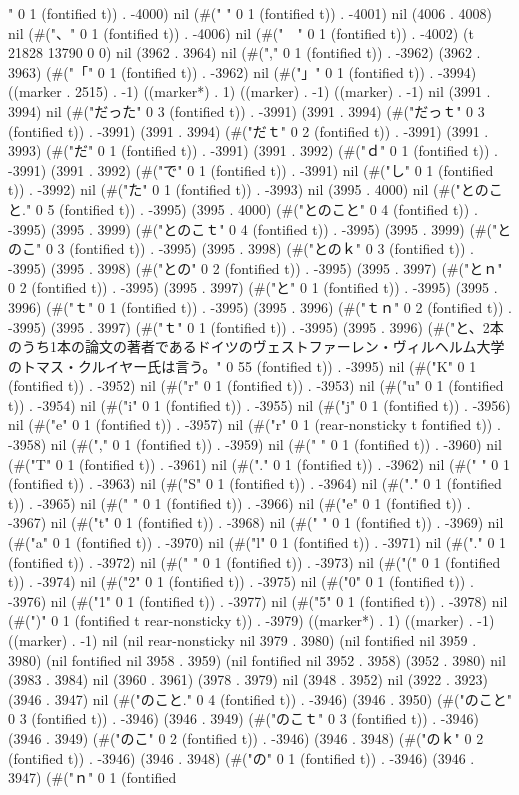 " 0 1 (fontified t)) . -4000) nil (#("
" 0 1 (fontified t)) . -4001) nil (4006 . 4008) nil (#("、" 0 1 (fontified t)) . -4006) nil (#("　" 0 1 (fontified t)) . -4002) (t 21828 13790 0 0) nil (3962 . 3964) nil (#("," 0 1 (fontified t)) . -3962) (3962 . 3963) (#("「" 0 1 (fontified t)) . -3962) nil (#("」" 0 1 (fontified t)) . -3994) ((marker . 2515) . -1) ((marker*) . 1) ((marker) . -1) ((marker) . -1) nil (3991 . 3994) nil (#("だった" 0 3 (fontified t)) . -3991) (3991 . 3994) (#("だっｔ" 0 3 (fontified t)) . -3991) (3991 . 3994) (#("だｔ" 0 2 (fontified t)) . -3991) (3991 . 3993) (#("だ" 0 1 (fontified t)) . -3991) (3991 . 3992) (#("ｄ" 0 1 (fontified t)) . -3991) (3991 . 3992) (#("で" 0 1 (fontified t)) . -3991) nil (#("し" 0 1 (fontified t)) . -3992) nil (#("た" 0 1 (fontified t)) . -3993) nil (3995 . 4000) nil (#("とのこと." 0 5 (fontified t)) . -3995) (3995 . 4000) (#("とのこと" 0 4 (fontified t)) . -3995) (3995 . 3999) (#("とのこｔ" 0 4 (fontified t)) . -3995) (3995 . 3999) (#("とのこ" 0 3 (fontified t)) . -3995) (3995 . 3998) (#("とのｋ" 0 3 (fontified t)) . -3995) (3995 . 3998) (#("との" 0 2 (fontified t)) . -3995) (3995 . 3997) (#("とｎ" 0 2 (fontified t)) . -3995) (3995 . 3997) (#("と" 0 1 (fontified t)) . -3995) (3995 . 3996) (#("ｔ" 0 1 (fontified t)) . -3995) (3995 . 3996) (#("ｔｎ" 0 2 (fontified t)) . -3995) (3995 . 3997) (#("ｔ" 0 1 (fontified t)) . -3995) (3995 . 3996) (#("と、2本のうち1本の論文の著者であるドイツのヴェストファーレン・ヴィルヘルム大学のトマス・クルイヤー氏は言う。" 0 55 (fontified t)) . -3995) nil (#("K" 0 1 (fontified t)) . -3952) nil (#("r" 0 1 (fontified t)) . -3953) nil (#("u" 0 1 (fontified t)) . -3954) nil (#("i" 0 1 (fontified t)) . -3955) nil (#("j" 0 1 (fontified t)) . -3956) nil (#("e" 0 1 (fontified t)) . -3957) nil (#("r" 0 1 (rear-nonsticky t fontified t)) . -3958) nil (#("," 0 1 (fontified t)) . -3959) nil (#(" " 0 1 (fontified t)) . -3960) nil (#("T" 0 1 (fontified t)) . -3961) nil (#("." 0 1 (fontified t)) . -3962) nil (#(" " 0 1 (fontified t)) . -3963) nil (#("S" 0 1 (fontified t)) . -3964) nil (#("." 0 1 (fontified t)) . -3965) nil (#(" " 0 1 (fontified t)) . -3966) nil (#("e" 0 1 (fontified t)) . -3967) nil (#("t" 0 1 (fontified t)) . -3968) nil (#(" " 0 1 (fontified t)) . -3969) nil (#("a" 0 1 (fontified t)) . -3970) nil (#("l" 0 1 (fontified t)) . -3971) nil (#("." 0 1 (fontified t)) . -3972) nil (#(" " 0 1 (fontified t)) . -3973) nil (#("(" 0 1 (fontified t)) . -3974) nil (#("2" 0 1 (fontified t)) . -3975) nil (#("0" 0 1 (fontified t)) . -3976) nil (#("1" 0 1 (fontified t)) . -3977) nil (#("5" 0 1 (fontified t)) . -3978) nil (#(")" 0 1 (fontified t rear-nonsticky t)) . -3979) ((marker*) . 1) ((marker) . -1) ((marker) . -1) nil (nil rear-nonsticky nil 3979 . 3980) (nil fontified nil 3959 . 3980) (nil fontified nil 3958 . 3959) (nil fontified nil 3952 . 3958) (3952 . 3980) nil (3983 . 3984) nil (3960 . 3961) (3978 . 3979) nil (3948 . 3952) nil (3922 . 3923) (3946 . 3947) nil (#("のこと." 0 4 (fontified t)) . -3946) (3946 . 3950) (#("のこと" 0 3 (fontified t)) . -3946) (3946 . 3949) (#("のこｔ" 0 3 (fontified t)) . -3946) (3946 . 3949) (#("のこ" 0 2 (fontified t)) . -3946) (3946 . 3948) (#("のｋ" 0 2 (fontified t)) . -3946) (3946 . 3948) (#("の" 0 1 (fontified t)) . -3946) (3946 . 3947) (#("ｎ" 0 1 (fontified 